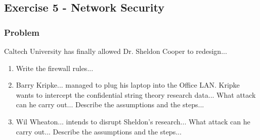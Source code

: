 \documentclass{article}
\begin{document}
\subsection{Exercise 5 - Network Security}
\subsubsection*{Problem}
Caltech University has finally allowed Dr. Sheldon Cooper to redesign... 
\begin{enumerate}
    \item[\textbf{1.}] [2 point] Write the firewall rules... 
    \item[\textbf{2.}] [2 points] Barry Kripke... managed to plug his laptop into the Office LAN. Kripke wants to intercept the confidential string theory research data... What attack can he carry out... Describe the assumptions and the steps... 
    \item[\textbf{3.}] [2 points] Wil Wheaton... intends to disrupt Sheldon's research... What attack can he carry out... Describe the assumptions and the steps...
\end{enumerate}
\end{document}
